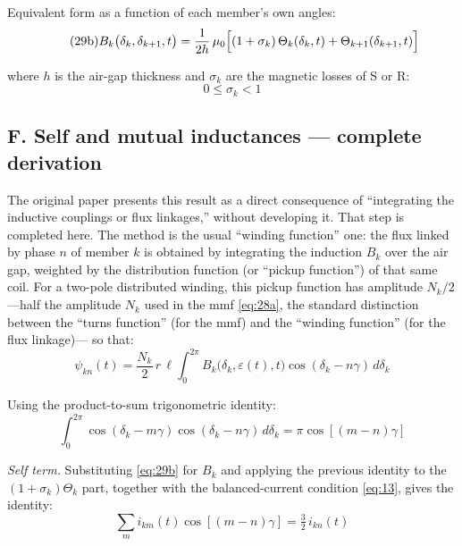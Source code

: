 \documentclass[11pt,a4paper]{article}
\begin{document}
Equivalent form as a function of each member's own angles:
\begin{equation}\tag{29b}\label{eq:29b}
B_k\bigl(\delta_k,\delta_{k+1},t\bigr) = \frac{1}{2h}\,\mu_0\Bigl[(1+\sigma_k)\,\Theta_k(\delta_k,t) + \Theta_{k+1}(\delta_{k+1},t)\Bigr]
\end{equation}

where $h$ is the air-gap thickness and $\sigma_k$ are the magnetic losses of S or R:
\begin{equation}\tag{29c}\label{eq:29c}
0 \le \sigma_k < 1
\end{equation}

\subsection*{F. Self and mutual inductances --- complete derivation}

The original paper presents this result as a direct consequence of ``integrating the inductive couplings or flux linkages,'' without developing it. That step is completed here. The method is the usual ``winding function'' one: the flux linked by phase $n$ of member $k$ is obtained by integrating the induction $B_k$ over the air gap, weighted by the distribution function (or ``pickup function'') of that same coil. For a two-pole distributed winding, this pickup function has amplitude $N_k/2$ ---half the amplitude $N_k$ used in the mmf \eqref{eq:28a}, the standard distinction between the ``turns function'' (for the mmf) and the ``winding function'' (for the flux linkage)--- so that:
\begin{equation}\tag{29d}\label{eq:29d}
\psi_{kn}(t) = \frac{N_k}{2}\,r\,\ell\int_0^{2\pi} B_k\bigl(\delta_k,\varepsilon(t),t\bigr)\cos(\delta_k - n\gamma)\,d\delta_k
\end{equation}

Using the product-to-sum trigonometric identity:
\begin{equation}\tag{29e}\label{eq:29e}
\int_0^{2\pi}\cos(\delta_k - m\gamma)\cos(\delta_k - n\gamma)\,d\delta_k = \pi\cos[(m-n)\gamma]
\end{equation}

\emph{Self term.} Substituting \eqref{eq:29b} for $B_k$ and applying the previous identity to the $(1+\sigma_k)\Theta_k$ part, together with the balanced-current condition \eqref{eq:13}, gives the identity:
\begin{equation}\tag{29f}\label{eq:29f}
\sum_m i_{km}(t)\cos[(m-n)\gamma] = \tfrac32\, i_{kn}(t)
\end{equation}
\end{document}
